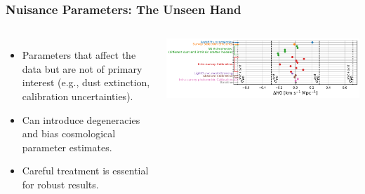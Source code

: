 \documentclass[aspectratio=169]{beamer}
\begin{document}
\begin{frame}
    \frametitle{Nuisance Parameters: The Unseen Hand}
    \begin{columns}
        \begin{itemize}
            \item Parameters that affect the data but are not of primary interest (e.g., dust extinction, calibration uncertainties).
            \item Can introduce degeneracies and bias cosmological parameter estimates.
            \item Careful treatment is essential for robust results.
        \end{itemize}
        \includegraphics[width=\textwidth]{figures/snia_H0_syst.pdf}
    \end{columns}
\end{frame}
\end{document}

